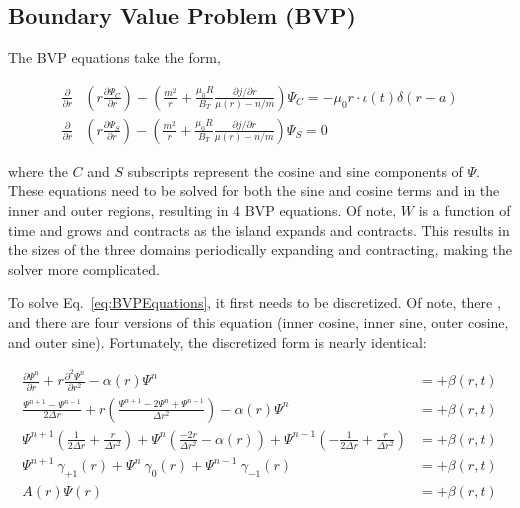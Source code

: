 \documentclass{article}
\begin{document}
\subsection{Boundary Value Problem (BVP)}


The BVP equations take the form,


\begin{equation} \label{eq:BVPEquations}
\begin{split}
\frac{\partial}{\partial r} &  \left( r \frac{\partial \Psi_C}{\partial r} \right)-\left( \frac{m^2}{r} +\frac{\mu_0 R}{B_T} \frac{\partial j / \partial r}{\mu(r)-n/m} \right) \Psi_C  = - \mu_0r \cdot \iota(t) \delta (r-a)  \\
 \frac{\partial}{\partial r} &  \left( r \frac{\partial \Psi_S}{\partial r} \right)-\left( \frac{m^2}{r} +\frac{\mu_0 R}{B_T} \frac{\partial j / \partial r}{\mu(r)-n/m} \right) \Psi_S =0
\end{split}
\end{equation}

\noindent where the $C$ and $S$ subscripts represent the cosine and sine components of $\Psi$.  These equations need to be solved for both the sine and cosine terms and in the inner and outer regions, resulting in 4 BVP equations.  Of note, $W$ is a function of time and grows and contracts as the island expands and contracts.  This results in the sizes of the three domains periodically expanding and contracting, making the solver more complicated.   

To solve Eq.~\ref{eq:BVPEquations}, it first needs to be discretized.  Of note, there , and there are four versions of this equation (inner cosine, inner sine, outer cosine, and outer sine).  Fortunately, the discretized form is nearly identical:


\begin{equation} \label{eq:BVPSolved}
\begin{split}
 \frac{\partial \Psi^n}{\partial r} + r \frac{\partial^2 \Psi^n}{\partial r^2} -\alpha(r)  \Psi^n  & = + \beta(r,t) \\ 
 \frac{\Psi^{n+1}-\Psi^{n-1}}{2\Delta r}+r\left(\frac{\Psi^{n+1}-2\Psi^{n}+\Psi^{n-1}}{\Delta r^2}\right)-\alpha(r)\Psi^n & = + \beta(r,t)  \\
  \Psi^{n+1}\left(\frac{1}{2 \Delta r}+\frac{r}{\Delta r^2 }\right) + \Psi^n\left( \frac{-2r}{\Delta r^2} -\alpha(r) \right) + \Psi^{n-1}\left(-\frac{1}{2\Delta r} + \frac{r}{\Delta r^2} \right) & = + \beta(r,t) \\
  \Psi^{n+1} \ \gamma_{+1}(r) + \Psi^n \ \gamma_{0}(r) + \Psi^{n-1} \ \gamma_{-1}(r) & = + \beta(r,t) \\
A(r) \Psi(r) & = +\beta(r,t) \\
\end{split}
\end{equation}
\end{document}
